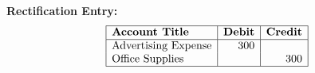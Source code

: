 \documentclass[12pt,a4paper]{book}
\begin{document}
\textbf{Rectification Entry:}
\[
\begin{array}{|l|r|r|}
\hline
\textbf{Account Title} & \textbf{Debit} & \textbf{Credit} \\
\hline
\text{Advertising Expense} & 300 & \\
\text{Office Supplies} & & 300 \\
\hline
\end{array}
\]

\vspace{0.5cm}
\clearpage


\end{document}
